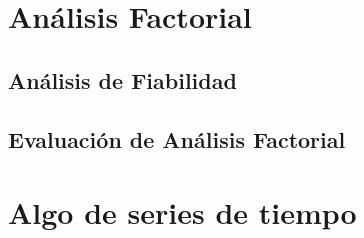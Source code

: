 \documentclass[]{book}
\begin{document}
\chapter{Análisis Factorial}\label{analisis-factorial}

\section{Análisis de Fiabilidad}\label{analisis-de-fiabilidad}

\section{Evaluación de Análisis
Factorial}\label{evaluacion-de-analisis-factorial}

\chapter{Algo de series de tiempo}\label{algo-de-series-de-tiempo}


\end{document}
